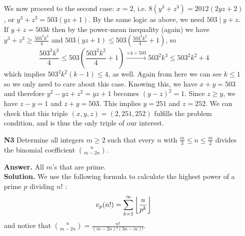 \documentclass[11pt,a4paper]{article}
\begin{document}
\begin{enumerate}
\begin{itemize}
	\end{itemize}
	We now proceed to the second case: $x=2$, i.e. $8(y^3+z^3)=2012(2yz+2)$, or $y^3+z^3=503(yz+1)$. By the same logic as above, we need $503\mid y+z$. 
	If $y+z=503k$ then by the power-mean inequality (again) we have 
	$y^3+z^3\ge \frac{503^3k^3}{4}$ and 
	$503(yz+1)\le 503(\frac{503^2k^2}{4}+1)$, so 
	\[\frac{503^3k^3}{4}\le 503(\frac{503^2k^2}{4}+1)
	\stackrel{\times 4\div 503}{\to}
	503^2k^3\le 503^2k^2+4
	\]
	which implies $503^2k^2(k-1)\le 4$, as well. Again from here we can see $k\le 1$ so we only need to care about this case. Knowing this, we have $x+y=503$ and therefore $y^2-yz+z^2=yz+1$ becomes $(y-z)^2=1$. Since $z\ge y$, we have $z-y=1$ and $z+y=503$. This implies $y=251$ and $z=252$. We can check that this triple $(x, y, z)=(2, 251, 252)$ fulfills the problem condition, and is thus the only triple of our interest. 
	
	\item [\textbf{N3}] Determine all integers $m \geq 2$ such that every $n$ with $\frac{m}{3} \leq n \leq \frac{m}{2}$ divides the binomial coefficient $\binom{n}{m-2n}$.
	
	\textbf{Answer.} All $m$'s that are prime. \\
	\textbf{Solution.} We use the following formula to calculate the highest power of a prime $p$ dividing $n!$ : 
	\[
	v_p(n!)=\displaystyle\sum_{k=1}^{\infty}\left\lfloor \frac{n}{p^k}\right\rfloor
	\]
	and notice that $\binom{n}{m-2n}=\frac{n!}{(m-2n)!(3n-m)!}$. 
	

\end{enumerate}
\end{document}
